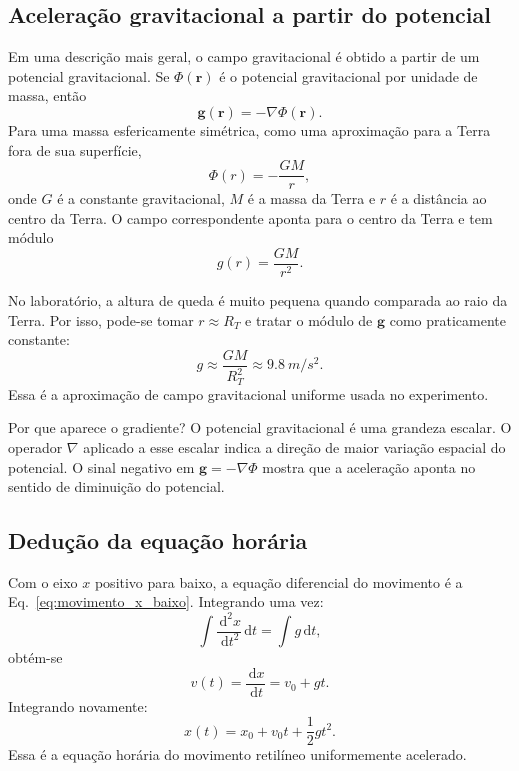 \documentclass[11pt,a4paper]{article}
\newcommand{\dif}{\,\mathrm{d}}
\newcommand{\vet}[1]{\bm{#1}}
\begin{document}
\subsection{Aceleração gravitacional a partir do potencial}

Em uma descrição mais geral, o campo gravitacional é obtido a partir de um potencial gravitacional. Se $\Phi(\vet r)$ é o potencial gravitacional por unidade de massa, então
\begin{equation}
  \vet g(\vet r)=-\nabla \Phi(\vet r).
  \label{eq:campo_potencial}
\end{equation}
Para uma massa esfericamente simétrica, como uma aproximação para a Terra fora de sua superfície,
\begin{equation}
  \Phi(r)=-\frac{GM}{r},
\end{equation}
onde $G$ é a constante gravitacional, $M$ é a massa da Terra e $r$ é a distância ao centro da Terra. O campo correspondente aponta para o centro da Terra e tem módulo
\begin{equation}
  g(r)=\frac{GM}{r^2}.
\end{equation}

No laboratório, a altura de queda é muito pequena quando comparada ao raio da Terra. Por isso, pode-se tomar $r\approx R_T$ e tratar o módulo de $\vet g$ como praticamente constante:
\begin{equation}
  g\approx \frac{GM}{R_T^2}\approx \SI{9,8}{m/s^2}.
\end{equation}
Essa é a aproximação de campo gravitacional uniforme usada no experimento.

\begin{caixaIdeia}{Por que aparece o gradiente?}
O potencial gravitacional é uma grandeza escalar. O operador $\nabla$ aplicado a esse escalar indica a direção de maior variação espacial do potencial. O sinal negativo em $\vet g=-\nabla\Phi$ mostra que a aceleração aponta no sentido de diminuição do potencial.
\end{caixaIdeia}

\subsection{Dedução da equação horária}

Com o eixo $x$ positivo para baixo, a equação diferencial do movimento é a Eq.~\eqref{eq:movimento_x_baixo}. Integrando uma vez:
\begin{equation}
  \int \frac{\dif^2x}{\dif t^2}\dif t=\int g\dif t,
\end{equation}
obtém-se
\begin{equation}
  v(t)=\frac{\dif x}{\dif t}=v_0+gt.
  \label{eq:velocidade}
\end{equation}
Integrando novamente:
\begin{equation}
  x(t)=x_0+v_0t+\frac{1}{2}gt^2.
  \label{eq:posicao_geral}
\end{equation}
Essa é a equação horária do movimento retilíneo uniformemente acelerado.
\end{document}
